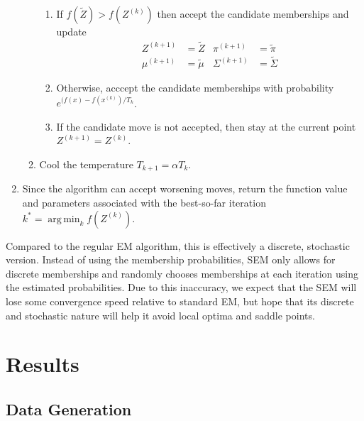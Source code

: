 \documentclass{article}
\DeclareMathOperator*{\argmin}{arg\,min}
\theoremstyle{definition}
\theoremstyle{algodesc}
\begin{document}
\begin{enumerate}
\begin{enumerate}
    \begin{enumerate}
    \item If $f(\tilde{Z}) > f(Z^{(k)})$ then accept the candidate memberships and update
      \begin{align*}
      Z^{(k+1)} &= \tilde{Z} & \pi^{(k+1)} &= \tilde{\pi} \\
      \mu^{(k+1)} &= \tilde{\mu} & \Sigma^{(k+1)} &= \tilde{\Sigma}
      \end{align*}
    \item Otherwise, acccept the candidate memberships with probability $e^{(f(x) - f(x^{(k)})/T_k}$.
    \item If the candidate move is not accepted, then stay at the current point $Z^{(k+1)} = Z^{(k)}$.
    \end{enumerate}
  \item Cool the temperature $T_{k+1} = \alpha T_{k}$.
  \end{enumerate}
\item Since the algorithm can accept worsening moves, return the function value and parameters associated with the best-so-far iteration $k^* = \argmin_{k} f(Z^{(k)})$.
\end{enumerate}

Compared to the regular EM algorithm, this is effectively a discrete, stochastic version. Instead of using the membership probabilities, SEM only allows for discrete memberships and randomly chooses memberships at each iteration using the estimated probabilities. Due to this inaccuracy, we expect that the SEM will lose some convergence speed relative to standard EM, but hope that its discrete and stochastic nature will help it avoid local optima and saddle points.


\section{Results} \label{sec:results}


\subsection{Data Generation}
\end{document}
